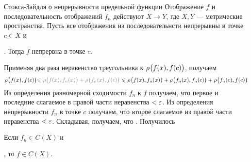 
\begin{teor}[https://www.youtube.com/live/oGN0SkfpZME?si=rzyEi2Hd6nOeRw-i&t=11638]{Стокса-Зайдля о непрерывности предельной функции}\label{ст-зд}
	Отображение $f$ и последовательность отображений $f_n$ действуют $X \to Y$, где $X, Y$ --- метрические пространства. Пусть все отображения из последовательнсти непрерывны в точке $c \in X$ и\!. Тогда $f$ непрервна в точке $c$.
\end{teor} %

\begin{prf} %
	Применяя два раза неравенство треугольника к $\rho_{}\bigl(f(x), f(c)\bigr)$, получаем 
	\[\bmetr{f(x), f(c)} \uns{\< \bmetr{f(x), f_n(x)} + \bmetr{f_n(x), f(c)}}\< \bmetr{f(x), f_n(x)} + \bmetr{f_n(x), f_n(c)} + \bmetr{f_n(c), f(c)}\]
	Из определения равномерной сходимости $f_n$ к $f$
	\linebreak
	 получаем, что  первое и последние слагаемое в правой части неравенства $< \varepsilon$. Из определения непрерывности $f_n$ в точке $c$ 
	 получаем, что  второе слагаемое из правой части неравенства $< \varepsilon$. Складывая, получаем, что .
	 Получилось  
\end{prf} %

\begin{slv}[https://www.youtube.com/live/oGN0SkfpZME?si=8DDuSzi86njoQaMf&t=11737]\label{непр.на X}
	Если $f_n \in C(X)$ и\!, то $f \in C(X)$. 
\end{slv} %

